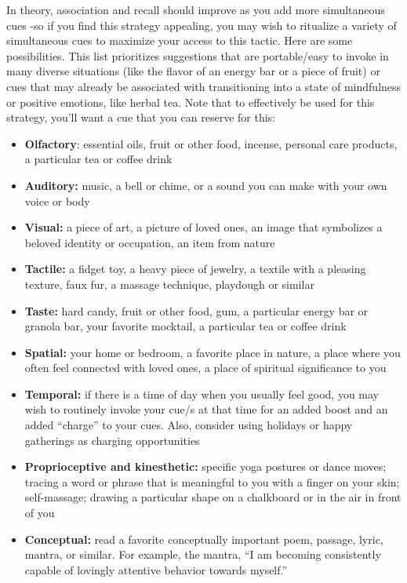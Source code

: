 \documentclass[12pt,letterpaper]{book}
\begin{document}
In theory, association and recall should improve as you add more simultaneous cues -so if you find this strategy appealing, you may wish to ritualize a variety of simultaneous cues to maximize your access to this tactic. Here are some possibilities. This list prioritizes suggestions that are portable/easy to invoke in many diverse situations (like the flavor of an energy bar or a piece of fruit) or cues that may already be associated with transitioning into a state of mindfulness or positive emotions, like herbal tea. Note that to effectively be used for this strategy, you'll want a cue that you can reserve for this:
\begin{itemize}
    \item \textbf{Olfactory}: essential oils, fruit or other food, incense, personal care products, a particular tea or coffee drink
    \item \textbf{Auditory:} music, a bell or chime, or a sound you can make with your own voice or body 
    \item \textbf{Visual:} a piece of art, a picture of loved ones, an image that symbolizes a beloved identity or occupation, an item from nature
    \item \textbf{Tactile:} a fidget toy, a heavy piece of jewelry, a textile with a pleasing texture, faux fur, a massage technique, playdough or similar
    \item \textbf{Taste:} hard candy, fruit or other food, gum, a particular energy bar or granola bar, your favorite mocktail, a particular tea or coffee drink
    \item \textbf{Spatial:} your home or bedroom, a favorite place in nature, a place where you often feel connected with loved ones, a place of spiritual significance to you
    \item \textbf{Temporal:} if there is a time of day when you usually feel good, you may wish to routinely invoke your cue/s at that time for an added boost and an added “charge” to your cues. Also, consider using holidays or happy gatherings as charging opportunities
    \item \textbf{Proprioceptive and kinesthetic:} specific yoga postures or dance moves; tracing a word or phrase that is meaningful to you with a finger on your skin; self-massage; drawing a particular shape on a chalkboard or in the air in front of you
    \item \textbf{Conceptual:} read a favorite conceptually important poem, passage, lyric, mantra, or similar. For example, the mantra, “I am becoming consistently capable of lovingly attentive behavior towards myself.”
\end{itemize}
\end{document}
